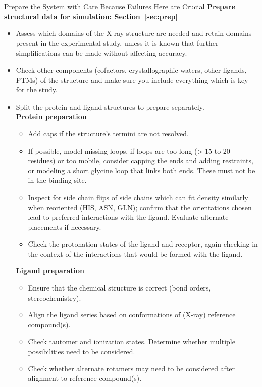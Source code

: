 \documentclass[9pt,bestpractices,pubversion]{livecoms}
\begin{document}
\begin{Checklists*}[hp!]
\begin{checklist}{Prepare the System with Care Because Failures Here are Crucial}
\textbf{Prepare structural data for simulation: Section~\ref{sec:prep}}
    \begin{itemize}
        \item Assess which domains of the X-ray structure are needed and retain domains present in the experimental study, unless it is known that further simplifications can be made without affecting accuracy.
        \item Check other components (cofactors, crystallographic waters, other ligands, PTMs) of the structure and make sure you include everything which is key for the study.
        \item Split the protein and ligand structures to prepare separately.\\
        \textbf{Protein preparation}
    \begin{itemize}
                \item Add caps if the structure's termini are not resolved.
                \item If possible, model missing loops, if loops are too long (> 15 to 20 residues) or too mobile, consider capping the ends and adding restraints, or modeling a short glycine loop that links both ends. These must not be in the binding site.
                \item Inspect for side chain flips of side chains which can fit density similarly when reoriented (HIS, ASN, GLN); confirm that the orientations chosen lead to preferred interactions with the ligand. Evaluate alternate placements if necessary.
                \item Check the protonation states of the ligand and receptor, again checking in the context of the interactions that would be formed with the ligand.
    \end{itemize}
        \textbf{Ligand preparation}
    \begin{itemize}
            \item Ensure that the chemical structure is correct (bond orders, stereochemistry).
            \item Align the ligand series based on conformations of (X-ray) reference compound(s).
            \item Check tautomer and ionization states. Determine whether multiple possibilities need to be considered.
            \item Check whether alternate rotamers may need to be considered after alignment to reference compound(s).

\end{itemize}
\end{itemize}
\end{checklist}
\end{Checklists*}
\end{document}
